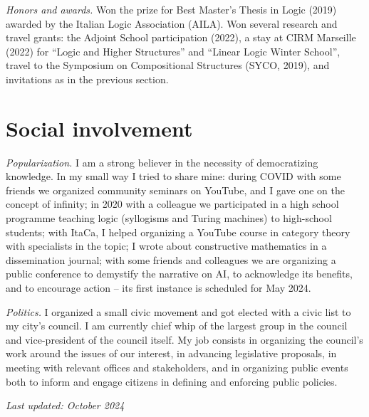 \documentclass[a4paper,9pt]{article}
\begin{document}
\textit{Honors and awards.} Won the prize for Best Master's Thesis in Logic (2019) awarded by the Italian Logic Association (AILA). Won several research and travel grants: the Adjoint School participation (2022), a stay at CIRM Marseille (2022) for ``Logic and Higher Structures'' and ``Linear Logic Winter School'', travel to the Symposium on Compositional Structures (SYCO, 2019), and invitations as in the previous section.

\section*{ Social involvement}
\textit{Popularization.} I am a strong believer in the necessity of democratizing knowledge. In my small way I tried
to share mine: during COVID with some friends we organized community seminars on YouTube, and I gave one on the concept of infinity; in 2020 with a colleague we participated in a high school programme teaching logic (syllogisms and Turing machines) to high-school students; with ItaCa, I helped organizing a YouTube course in category theory with specialists in the topic; I wrote about constructive mathematics in a dissemination journal; with some friends and colleagues we are organizing a public conference to demystify the narrative on AI, to acknowledge its benefits, and to encourage action -- its first instance is scheduled for May 2024.

\textit{Politics.} I organized a small civic movement and got elected with a civic list to my city's council. I am
currently chief whip of the largest group in the council and vice-president of the council itself.
My job consists in organizing the council's work around the issues of our interest, in advancing legislative
proposals, in meeting with relevant offices and stakeholders, and in organizing public events both to inform
and engage citizens in defining and enforcing public policies.

\vfill
\hfill\small\textit{Last updated: October 2024}
\end{document}
